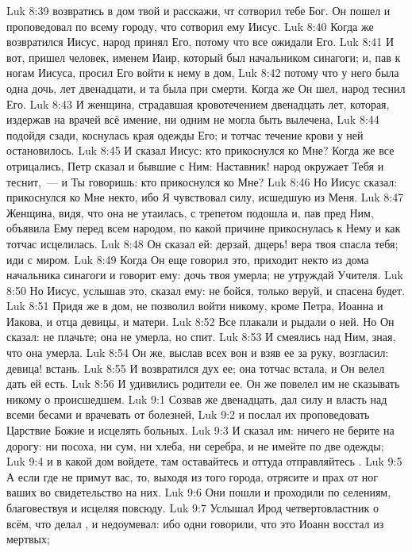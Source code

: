 \vs Luk 8:39 возвратись в дом твой и расскажи, чт сотворил тебе Бог. Он пошел и проповедовал по всему городу, что сотворил ему Иисус.
\rsbpar\vs Luk 8:40 Когда же возвратился Иисус, народ принял Его, потому что все ожидали Его.
\vs Luk 8:41 И вот, пришел человек, именем Иаир, который был начальником синагоги; и, пав к ногам Иисуса, просил Его войти к нему в дом,
\vs Luk 8:42 потому что у него была одна дочь, лет двенадцати, и та была при смерти. Когда же Он шел, народ теснил Его.
\vs Luk 8:43 И женщина, страдавшая кровотечением двенадцать лет, которая, издержав на врачей всё имение, ни одним не могла быть вылечена,
\vs Luk 8:44 подойдя сзади, коснулась края одежды Его; и тотчас течение крови у ней остановилось.
\vs Luk 8:45 И сказал Иисус: кто прикоснулся ко Мне? Когда же все отрицались, Петр сказал и бывшие с Ним: Наставник! народ окружает Тебя и теснит,~--- и Ты говоришь: кто прикоснулся ко Мне?
\vs Luk 8:46 Но Иисус сказал: прикоснулся ко Мне некто, ибо Я чувствовал силу, исшедшую из Меня.
\vs Luk 8:47 Женщина, видя, что она не утаилась, с трепетом подошла и, пав пред Ним, объявила Ему перед всем народом, по какой причине прикоснулась к Нему и как тотчас исцелилась.
\vs Luk 8:48 Он сказал ей: дерзай, дщерь! вера твоя спасла тебя; иди с миром.
\vs Luk 8:49 Когда Он еще говорил это, приходит некто из дома начальника синагоги и говорит ему: дочь твоя умерла; не утруждай Учителя.
\vs Luk 8:50 Но Иисус, услышав это, сказал ему: не бойся, только веруй, и спасена будет.
\vs Luk 8:51 Придя же в дом, не позволил войти никому, кроме Петра, Иоанна и Иакова, и отца девицы, и матери.
\vs Luk 8:52 Все плакали и рыдали о ней. Но Он сказал: не плачьте; она не умерла, но спит.
\vs Luk 8:53 И смеялись над Ним, зная, что она умерла.
\vs Luk 8:54 Он же, выслав всех вон и взяв ее за руку, возгласил: девица! встань.
\vs Luk 8:55 И возвратился дух ее; она тотчас встала, и Он велел дать ей есть.
\vs Luk 8:56 И удивились родители ее. Он же повелел им не сказывать никому о происшедшем.
\vs Luk 9:1 Созвав же двенадцать, дал силу и власть над всеми бесами и врачевать от болезней,
\vs Luk 9:2 и послал их проповедовать Царствие Божие и исцелять больных.
\vs Luk 9:3 И сказал им: ничего не берите на дорогу: ни посоха, ни сум, ни хлеба, ни серебра, и не имейте по две одежды;
\vs Luk 9:4 и в какой дом войдете, там оставайтесь и оттуда отправляйтесь .
\vs Luk 9:5 А если где не примут вас, то, выходя из того города, отрясите и прах от ног ваших во свидетельство на них.
\vs Luk 9:6 Они пошли и проходили по селениям, благовествуя и исцеляя повсюду.
\rsbpar\vs Luk 9:7 Услышал Ирод четвертовластник о всём, что делал , и недоумевал: ибо одни говорили, что это Иоанн восстал из мертвых;
